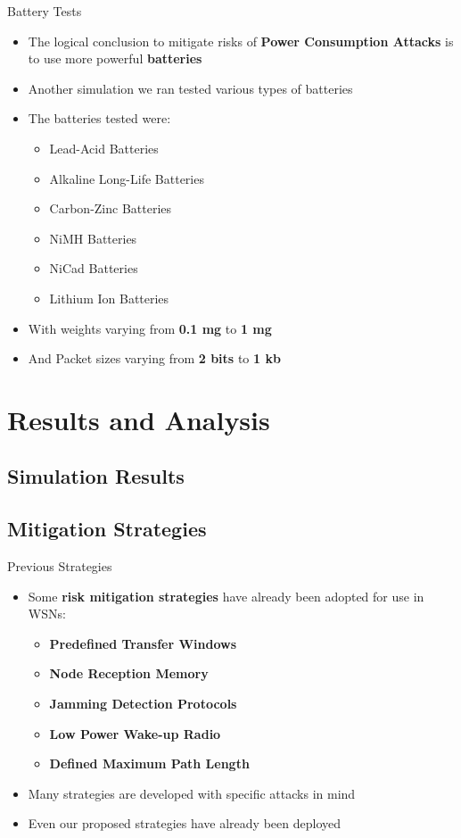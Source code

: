 \documentclass{beamer}
\begin{document}
\begin{frame}{Battery Tests}
\begin{itemize}
	\item The logical conclusion to mitigate risks of \textbf{Power Consumption Attacks} is to use more powerful \textbf{batteries}
	\item Another simulation we ran tested various types of batteries
	\item The batteries tested were: 
	\begin{itemize}
	  \item Lead-Acid Batteries
	  \item Alkaline Long-Life Batteries
	  \item Carbon-Zinc Batteries
	  \item NiMH Batteries
	  \item NiCad Batteries
	  \item Lithium Ion Batteries
	\end{itemize}
	\item With weights varying from \textbf{0.1 mg} to \textbf{1 mg}
	\item And Packet sizes varying from \textbf{2 bits} to \textbf{1 kb}
\end{itemize}
\end{frame}

\section{Results and Analysis}

\subsection{Simulation Results}

\subsection{Mitigation Strategies}

\begin{frame}{Previous Strategies}

\begin{itemize}

	\item Some \textbf{risk mitigation strategies} have already been adopted for use in WSNs:
	\begin{itemize}
		\item \textbf{Predefined Transfer Windows}
		\item \textbf{Node Reception Memory}
		\item \textbf{Jamming Detection Protocols}
		\item \textbf{Low Power Wake-up Radio}
		\item \textbf{Defined Maximum Path Length}
	\end{itemize}
	\item Many strategies are developed with specific attacks in mind
	\item Even our proposed strategies have already been deployed
	
\end{itemize}

\end{frame}
\end{document}
